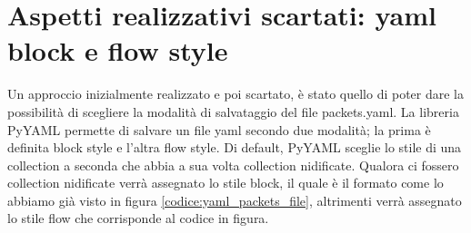 \documentclass[binding=0.6cm]{sapthesis}
\begin{document}
 \section{Aspetti realizzativi scartati: yaml block e flow style}
 \label{sec:aspetti_realizzativi_scartati}
 Un approccio inizialmente realizzato e poi scartato, è stato quello di poter dare la possibilità di scegliere la modalità di salvataggio del file packets.yaml.
La libreria PyYAML permette di salvare un file yaml secondo due modalità; la prima è definita block style e l'altra flow style.
Di default, PyYAML sceglie lo stile di una collection a seconda che abbia a sua volta collection nidificate. Qualora ci fossero collection nidificate
verrà assegnato lo stile block, il quale è il formato come lo abbiamo già visto in figura \ref{codice:yaml_packets_file}, altrimenti verrà assegnato
lo stile flow che corrisponde al codice in figura.
\end{document}
